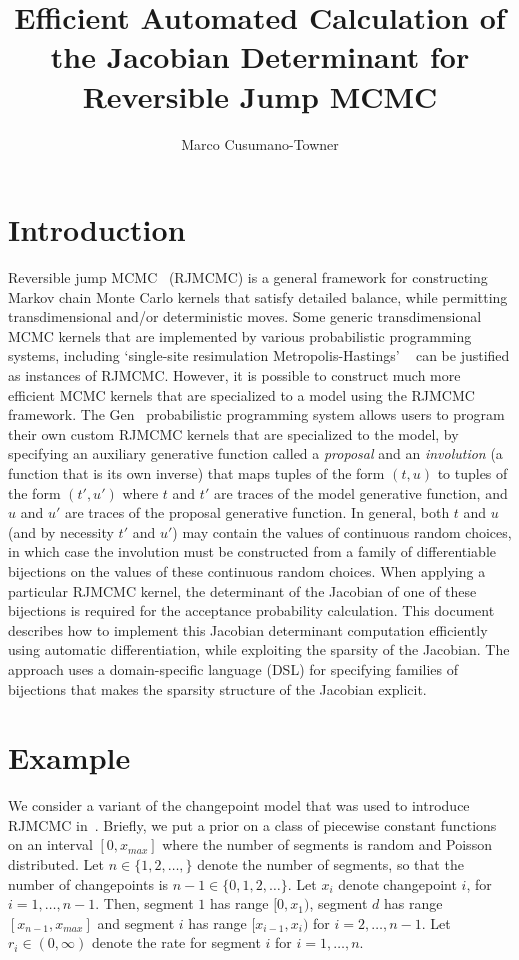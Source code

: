 \documentclass{article}
\title{Efficient Automated Calculation of the Jacobian Determinant for Reversible Jump MCMC}
\author{Marco Cusumano-Towner}
\date{}
\begin{document}
\maketitle

\section{Introduction}
Reversible jump MCMC~\citep{green1995reversible} (RJMCMC) is a general framework for constructing Markov chain Monte Carlo kernels that satisfy detailed balance, while permitting transdimensional and/or deterministic moves.
Some generic transdimensional MCMC kernels that are implemented by various probabilistic programming systems, including `single-site resimulation Metropolis-Hastings' ~\citep{goodman2008church,wingate2011lightweight} can be justified as instances of RJMCMC.
However, it is possible to construct much more efficient MCMC kernels that are specialized to a model using the RJMCMC framework.
The Gen~\citep{cusumano2019gen} probabilistic programming system allows users to program their own custom RJMCMC kernels that are specialized to the model, by specifying an auxiliary generative function called a \emph{proposal} and an \emph{involution} (a function that is its own inverse) that maps tuples of the form $(t, u)$ to tuples of the form $(t', u')$ where $t$ and $t'$ are traces of the model generative function, and $u$ and $u'$ are traces of the proposal generative function.
In general, both $t$ and $u$ (and by necessity $t'$ and $u'$) may contain the values of continuous random choices, in which case the involution must be constructed from a family of differentiable bijections on the values of these continuous random choices.
When applying a particular RJMCMC kernel, the determinant of the Jacobian of one of these bijections is required for the acceptance probability calculation.
This document describes how to implement this Jacobian determinant computation efficiently using automatic differentiation, while exploiting the sparsity of the Jacobian.
The approach uses a domain-specific language (DSL) for specifying families of bijections that makes the sparsity structure of the Jacobian explicit.

\section{Example}

We consider a variant of the changepoint model that was used to introduce RJMCMC in~\citep{green1995reversible}.
Briefly, we put a prior on a class of piecewise constant functions on an interval $[0, x_{max}]$ where the number of segments is random and Poisson distributed.
Let $n \in \{1, 2, \ldots, \}$ denote the number of segments, so that the number of changepoints is $n-1 \in \{0, 1, 2, \ldots\}$.
Let $x_i$ denote changepoint $i$, for $i=1,\ldots,n-1$.
Then, segment $1$ has range $[0, x_1)$, segment $d$ has range $[x_{n-1}, x_{max}]$ and segment $i$ has range $[x_{i-1}, x_i)$ for $i=2,\ldots,n-1$.
Let $r_i \in (0, \infty)$ denote the rate for segment $i$ for $i=1,\ldots,n$.
\end{document}
